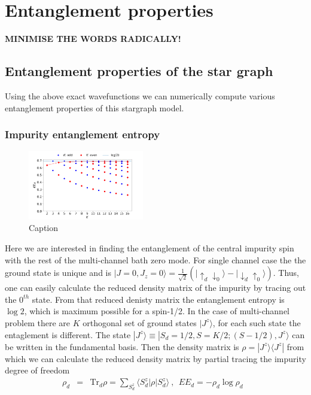 \documentclass[reprint,prb,superscriptaddress]{revtex4-2}
\begin{document}
\section{Entanglement properties}
\textbf{MINIMISE THE WORDS RADICALLY!}
\subsection{Entanglement properties of the star graph}
\noindent Using the above exact wavefunctions we can numerically compute various entanglement properties of this stargraph model. 

\subsubsection{Impurity entanglement entropy}
\begin{figure}[!htpb]
\centering
\includegraphics[width=0.45\textwidth]{plt/EE_multi_channel_ANN.png}
\caption{Caption }
\label{fig:EE_d}
\end{figure}
\noindent Here we are interested in finding the entanglement of the central impurity spin with the rest of the multi-channel bath zero mode. For single channel case the the ground state is unique and is $|J=0,J_z=0 \rangle = \frac{1}{\sqrt{2}} (|\uparrow_{d}\downarrow_0\rangle -|\downarrow_d \uparrow_0\rangle)$. Thus, one can easily calculate the reduced density matrix of the impurity by tracing out the $0^{th}$ state. From that reduced denisty matrix the entanglement entropy is $\log 2$, which is maximum possible for a spin-1/2. In the case of multi-channel problem there are $K$ orthogonal set of ground states $|J^z\rangle$, for each such state the entaglement is different. The state $|J^z\rangle \equiv |S_d=1/2,S=K/2;(S-1/2),J^z\rangle$ can be written in the fundamental basis. 
Then the density matrix is $\rho=|J^z\rangle\langle J^z|$ from which we can calculate the reduced density matrix by partial tracing the impurity degree of freedom 
\begin{eqnarray}
\rho_{d}&=& \textrm{Tr}_{d} \rho=\sum_{S_d^z} \langle S_d^z| \rho | S^z_d\rangle ~,~~EE_d = -\rho_{d} \log \rho_{d}~~~
\end{eqnarray}
\end{document}

